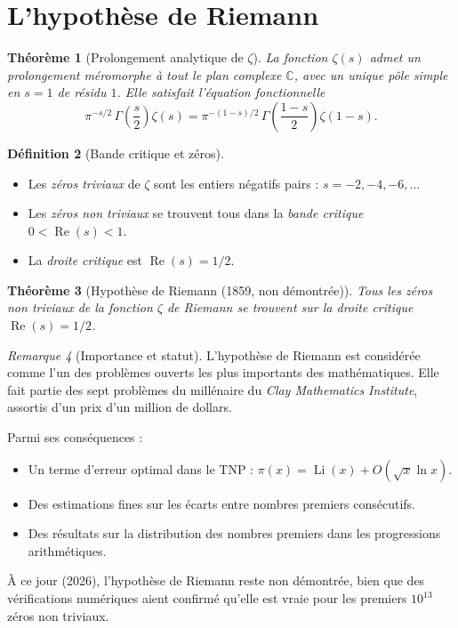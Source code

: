 \documentclass[12pt,a4paper,openany]{book}
\theoremstyle{definition}
\newtheorem{definition}{Définition}[chapter]
\theoremstyle{plain}
\newtheorem{theoreme}[definition]{Théorème}
\theoremstyle{remark}
\newtheorem{remarque}[definition]{Remarque}
\newcommand{\C}{\mathbb{C}}
\begin{document}

\section{L'hypothèse de Riemann}
\label{sec:RH}

\begin{theoreme}[Prolongement analytique de $\zeta$]
\label{thm:prolongement-zeta}
La fonction $\zeta(s)$ admet un prolongement méromorphe à tout le plan complexe
$\C$, avec un unique pôle simple en $s = 1$ de résidu $1$. Elle satisfait
l'équation fonctionnelle
\[
  \pi^{-s/2}\, \Gamma\!\left(\frac{s}{2}\right) \zeta(s)
  = \pi^{-(1-s)/2}\, \Gamma\!\left(\frac{1-s}{2}\right) \zeta(1-s).
\]
\end{theoreme}

\begin{definition}[Bande critique et zéros]
\label{def:bande-critique}
\begin{itemize}
  \item Les \emph{zéros triviaux} de $\zeta$ sont les
    entiers négatifs pairs : $s = -2, -4, -6, \ldots$
  \item Les \emph{zéros non triviaux} se trouvent tous
    dans la \emph{bande critique} $0 < \operatorname{Re}(s) < 1$.
  \item La \emph{droite critique} est $\operatorname{Re}(s) = 1/2$.
\end{itemize}
\end{definition}

\begin{theoreme}[Hypothèse de Riemann (1859, non démontrée)]
\label{thm:RH}
Tous les zéros non triviaux de la fonction $\zeta$ de Riemann se trouvent sur la
droite critique $\operatorname{Re}(s) = 1/2$.
\end{theoreme}

\begin{remarque}[Importance et statut]
\label{rem:RH-statut}
L'hypothèse de Riemann est considérée comme l'un des problèmes ouverts les plus
importants des mathématiques. Elle fait partie des sept problèmes du millénaire
du \emph{Clay Mathematics Institute},
assortis d'un prix d'un million de dollars.

Parmi ses conséquences :
\begin{itemize}
  \item Un terme d'erreur optimal dans le TNP :
    $\pi(x) = \operatorname{Li}(x) + O(\sqrt{x} \ln x)$.
  \item Des estimations fines sur les écarts entre nombres premiers consécutifs.
  \item Des résultats sur la distribution des nombres premiers dans les
    progressions arithmétiques.
\end{itemize}

À ce jour (2026), l'hypothèse de Riemann reste non démontrée, bien que des
vérifications numériques aient confirmé qu'elle est vraie pour les premiers
$10^{13}$ zéros non triviaux.
\end{remarque}
\end{document}
